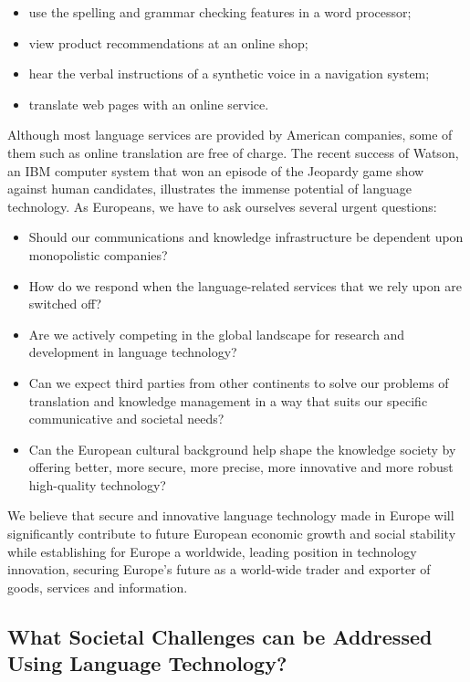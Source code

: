 \begin{multicols}{2}
\begin{itemize}
\item use the spelling and grammar checking features in a word processor;
\item view product recommendations at an online shop;
\item hear the verbal instructions of a synthetic voice in a navigation system;
\item translate web pages with an online service. 
\end{itemize}

Although most language services are provided by American companies, some of them such as online translation are free of charge. The recent success of Watson, an IBM computer system that won an episode of the Jeopardy game show against human candidates, illustrates the immense potential of language technology. As Europeans, we have to ask ourselves several urgent questions:

\begin{itemize}
\item Should our communications and knowledge infrastructure be dependent upon monopolistic companies?
\item How do we respond when the language-related services that we rely upon are switched off?
\item Are we actively competing in the global landscape for research and development in language technology?
\item Can we expect third parties from other continents to solve our problems of translation and knowledge management in a way that suits our specific communicative and societal needs?
\item Can the European cultural background help shape the knowledge society by offering better, more secure, more precise, more innovative and more robust high-quality technology?
\end{itemize}

We believe that secure and innovative language technology made in Europe will significantly contribute to future European economic growth and social stability while establishing for Europe a worldwide, leading position in technology innovation, securing Europe's future as a world-wide trader and exporter of goods, services and information.

\subsection{What Societal Challenges can be Addressed Using Language Technology?}
\label{sec:what-soci-challenges}


\end{multicols}

